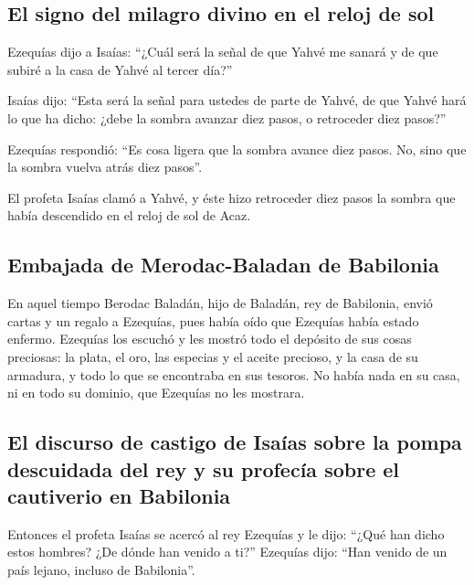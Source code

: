 \begin{paracol}{2}
\hypertarget{el-signo-del-milagro-divino-en-el-reloj-de-sol}{%
\subsection{El signo del milagro divino en el reloj de
sol}\label{el-signo-del-milagro-divino-en-el-reloj-de-sol}}

 Ezequías dijo a Isaías: ``¿Cuál será la señal de que
Yahvé me sanará y de que subiré a la casa de Yahvé al tercer día?''

 Isaías dijo: ``Esta será la señal para ustedes de parte
de Yahvé, de que Yahvé hará lo que ha dicho: ¿debe la sombra avanzar
diez pasos, o retroceder diez pasos?''

 Ezequías respondió: ``Es cosa ligera que la sombra
avance diez pasos. No, sino que la sombra vuelva atrás diez pasos''.

 El profeta Isaías clamó a Yahvé, y éste hizo retroceder
diez pasos la sombra que había descendido en el reloj de sol de Acaz.

\hypertarget{embajada-de-merodac-baladan-de-babilonia}{%
\subsection{Embajada de Merodac-Baladan de
Babilonia}\label{embajada-de-merodac-baladan-de-babilonia}}

 En aquel tiempo Berodac Baladán, hijo de Baladán, rey de
Babilonia, envió cartas y un regalo a Ezequías, pues había oído que
Ezequías había estado enfermo.  Ezequías los escuchó y
les mostró todo el depósito de sus cosas preciosas: la plata, el oro,
las especias y el aceite precioso, y la casa de su armadura, y todo lo
que se encontraba en sus tesoros. No había nada en su casa, ni en todo
su dominio, que Ezequías no les mostrara.

\hypertarget{el-discurso-de-castigo-de-isauxedas-sobre-la-pompa-descuidada-del-rey-y-su-profecuxeda-sobre-el-cautiverio-en-babilonia}{%
\subsection{El discurso de castigo de Isaías sobre la pompa descuidada
del rey y su profecía sobre el cautiverio en
Babilonia}\label{el-discurso-de-castigo-de-isauxedas-sobre-la-pompa-descuidada-del-rey-y-su-profecuxeda-sobre-el-cautiverio-en-babilonia}}

 Entonces el profeta Isaías se acercó al rey Ezequías y
le dijo: ``¿Qué han dicho estos hombres? ¿De dónde han venido a ti?''
Ezequías dijo: ``Han venido de un país lejano, incluso de Babilonia''.


\end{paracol}
